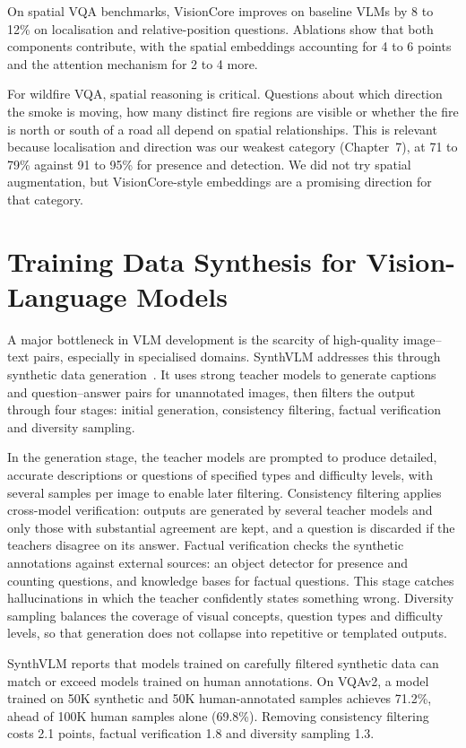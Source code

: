 \documentclass[12pt]{report}
\begin{document}
On spatial VQA benchmarks, VisionCore improves on baseline VLMs by 8 to 12\% on localisation and relative-position questions. Ablations show that both components contribute, with the spatial embeddings accounting for 4 to 6 points and the attention mechanism for 2 to 4 more.

For wildfire VQA, spatial reasoning is critical. Questions about which direction the smoke is moving, how many distinct fire regions are visible or whether the fire is north or south of a road all depend on spatial relationships. This is relevant because localisation and direction was our weakest category (Chapter~7), at 71 to 79\% against 91 to 95\% for presence and detection. We did not try spatial augmentation, but VisionCore-style embeddings are a promising direction for that category.

\section{Training Data Synthesis for Vision-Language Models}
A major bottleneck in VLM development is the scarcity of high-quality image--text pairs, especially in specialised domains. SynthVLM addresses this through synthetic data generation~\cite{synthvlm2024}. It uses strong teacher models to generate captions and question--answer pairs for unannotated images, then filters the output through four stages: initial generation, consistency filtering, factual verification and diversity sampling.

In the generation stage, the teacher models are prompted to produce detailed, accurate descriptions or questions of specified types and difficulty levels, with several samples per image to enable later filtering. Consistency filtering applies cross-model verification: outputs are generated by several teacher models and only those with substantial agreement are kept, and a question is discarded if the teachers disagree on its answer. Factual verification checks the synthetic annotations against external sources: an object detector for presence and counting questions, and knowledge bases for factual questions. This stage catches hallucinations in which the teacher confidently states something wrong. Diversity sampling balances the coverage of visual concepts, question types and difficulty levels, so that generation does not collapse into repetitive or templated outputs.

SynthVLM reports that models trained on carefully filtered synthetic data can match or exceed models trained on human annotations. On VQAv2, a model trained on 50K synthetic and 50K human-annotated samples achieves 71.2\%, ahead of 100K human samples alone (69.8\%). Removing consistency filtering costs 2.1 points, factual verification 1.8 and diversity sampling 1.3.
\end{document}
